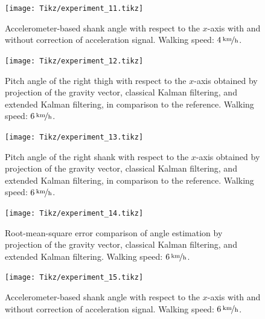 \begin{figure}
	\centering
	\setlength\figureheight{7cm} 
	\setlength\figurewidth{\textwidth}
	\texttt{[image: Tikz/experiment\_11.tikz]}
	\caption{Accelerometer-based shank angle with respect to the $x$-axis with and without correction of acceleration signal. Walking speed: $\unitfrac[4]{km}{h}$.}
	\label{fig:experiment_11}
\end{figure}

\begin{figure}
	\centering
	\setlength\figureheight{6.8cm} 
	\setlength\figurewidth{\textwidth}
	\texttt{[image: Tikz/experiment\_12.tikz]}
	\caption{Pitch angle of the right thigh with respect to the $x$-axis obtained by projection of the gravity vector, classical Kalman filtering, and extended Kalman filtering, in comparison to the reference. Walking speed: $\unitfrac[6]{km}{h}$.}
	\label{fig:experiment_12}
\end{figure}

\begin{figure}
	\centering
	\setlength\figureheight{6.8cm} 
	\setlength\figurewidth{\textwidth}
	\texttt{[image: Tikz/experiment\_13.tikz]}
	\caption{Pitch angle of the right shank with respect to the $x$-axis obtained by projection of the gravity vector, classical Kalman filtering, and extended Kalman filtering, in comparison to the reference. Walking speed: $\unitfrac[6]{km}{h}$.}
	\label{fig:experiment_13}
\end{figure}

\begin{figure}
	\centering
	\setlength\figureheight{7cm} 
	\setlength\figurewidth{\textwidth}
	\texttt{[image: Tikz/experiment\_14.tikz]}
	\caption{Root-mean-square error comparison of angle estimation by projection of the gravity vector, classical Kalman filtering, and extended Kalman filtering. Walking speed: $\unitfrac[6]{km}{h}$.}
	\label{fig:experiment_14}
\end{figure}

\begin{figure}
	\centering
	\setlength\figureheight{7cm} 
	\setlength\figurewidth{\textwidth}
	\texttt{[image: Tikz/experiment\_15.tikz]}
	\caption{Accelerometer-based shank angle with respect to the $x$-axis with and without correction of acceleration signal. Walking speed: $\unitfrac[6]{km}{h}$.}
	\label{fig:experiment_15}
\end{figure}

